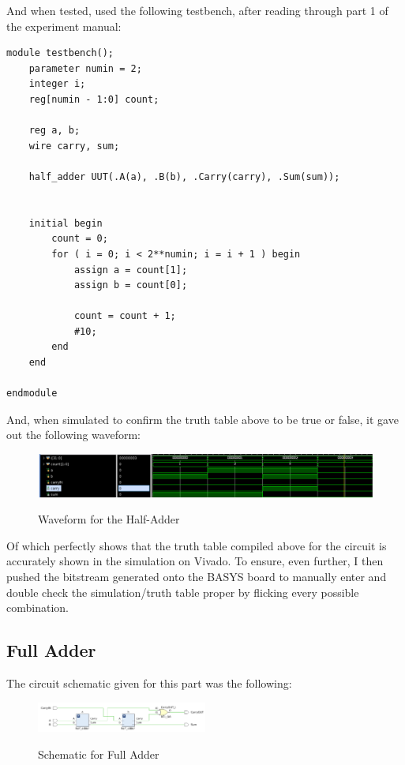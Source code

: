 And when tested, used the following testbench, after reading through part 1 of the experiment manual:
\begin{lstlisting}[label={label}, style=Verilog]
module testbench();
    parameter numin = 2;
    integer i;
    reg[numin - 1:0] count;
    
    reg a, b;
    wire carry, sum;
    
    half_adder UUT(.A(a), .B(b), .Carry(carry), .Sum(sum));

    
    initial begin
        count = 0;
        for ( i = 0; i < 2**numin; i = i + 1 ) begin
            assign a = count[1];
            assign b = count[0];
            
            count = count + 1;
            #10;
        end
    end
    
endmodule
\end{lstlisting}

And, when simulated to confirm the truth table above to be true or false, it gave out the following waveform:
\begin{figure}[!htbp]
    \centering
    \caption{Waveform for the Half-Adder}
    \includegraphics[width=1\textwidth]{part-1-half-waveform.png}
    \label{Figure 2}
\end{figure}
\newpage
Of which perfectly shows that the truth table compiled above for the circuit is accurately shown in the simulation on Vivado. To ensure, even further, I then pushed the bitstream generated onto the BASYS board to manually enter and double check the simulation/truth table proper by flicking every possible combination.

\subsection{Full Adder}
The circuit schematic given for this part was the following:

\begin{figure}[!htbp]
    \centering
    \caption{Schematic for Full Adder}
    \includegraphics[width=0.5\textwidth]{part-1-full-schem.png}
    \label{Full Adder Schematic}
\end{figure}

